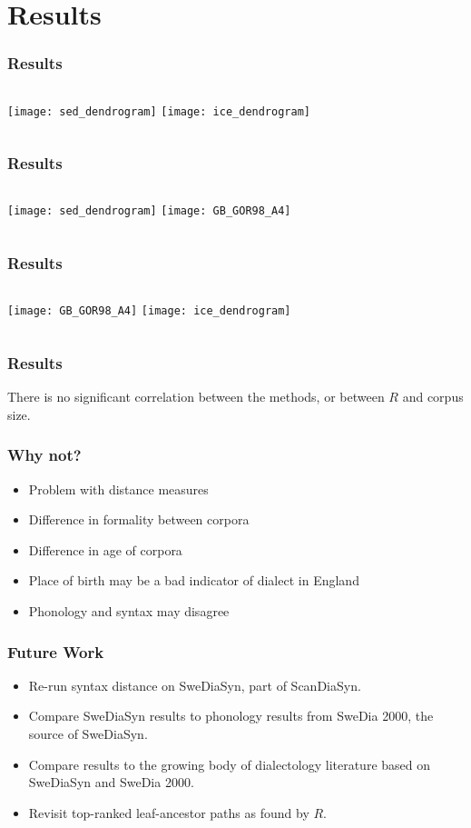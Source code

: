 \documentclass{beamer}
\begin{document}
\section{Results}
\begin{frame}
  \frametitle{Results}
  \begin{columns}
  \texttt{[image: sed\_dendrogram]}
  \texttt{[image: ice\_dendrogram]}
\end{columns}
\end{frame}
\begin{frame}
  \frametitle{Results}
  \begin{columns}
  \texttt{[image: sed\_dendrogram]}
  \texttt{[image: GB\_GOR98\_A4]}
\end{columns}
\end{frame}
\begin{frame}
  \frametitle{Results}
  \begin{columns}
  \texttt{[image: GB\_GOR98\_A4]}
  \texttt{[image: ice\_dendrogram]}
\end{columns}
\end{frame}
\begin{frame}
  \frametitle{Results}
  There is no significant correlation between the methods, or between
  $R$ and corpus size.
\end{frame}
\begin{frame}
  \frametitle{Why not?}
  \begin{itemize}
  \item Problem with distance measures
  \item Difference in formality between corpora
  \item Difference in age of corpora
  \item Place of birth may be a bad indicator of dialect in England
  \item Phonology and syntax may disagree
  \end{itemize}
\end{frame}
\begin{frame}
  \frametitle{Future Work}
  \begin{itemize}
  \item Re-run syntax distance on SweDiaSyn, part of ScanDiaSyn.
  \item Compare SweDiaSyn results to phonology results from SweDia
    2000, the source of SweDiaSyn.
  \item Compare results to the growing body of dialectology literature
    based on SweDiaSyn and SweDia 2000.
  \item Revisit top-ranked leaf-ancestor paths as found by $R$.
  \end{itemize}
\end{frame}
\end{document}
